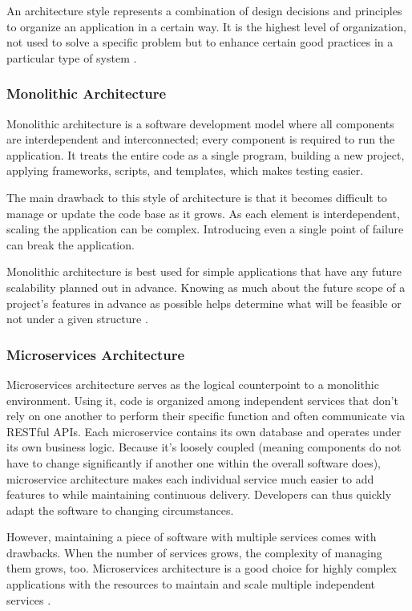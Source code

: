 An architecture style represents a combination of design decisions and principles to organize an application in a certain way. It is the highest level of organization, not used to solve a specific problem but to enhance certain good practices in a particular type of system \cite{ghidersa_software_2022}.

\subsubsection{Monolithic Architecture}

Monolithic architecture is a software development model where all components are interdependent and interconnected; every component is required to run the application. It treats the entire code as a single program, building a new project, applying frameworks, scripts, and templates, which makes testing easier.

The main drawback to this style of architecture is that it becomes difficult to manage or update the code base as it grows. As each element is interdependent, scaling the application can be complex. Introducing even a single point of failure can break the application.

Monolithic architecture is best used for simple applications that have any future scalability planned out in advance. Knowing as much about the future scope of a project's features in advance as possible helps determine what will be feasible or not under a given structure \cite{william_web_2025}.

\subsubsection{Microservices Architecture}

Microservices architecture serves as the logical counterpoint to a monolithic environment. Using it, code is organized among independent services that don't rely on one another to perform their specific function and often communicate via RESTful APIs. Each microservice contains its own database and operates under its own business logic. Because it’s loosely coupled (meaning components do not have to change significantly if another one within the overall software does), microservice architecture makes each individual service much easier to add features to while maintaining continuous delivery. Developers can thus quickly adapt the software to changing circumstances. 

However, maintaining a piece of software with multiple services comes with drawbacks. When the number of services grows, the complexity of managing them grows, too. Microservices architecture is a good choice for highly complex applications with the resources to maintain and scale multiple independent services \cite{william_web_2025}.

